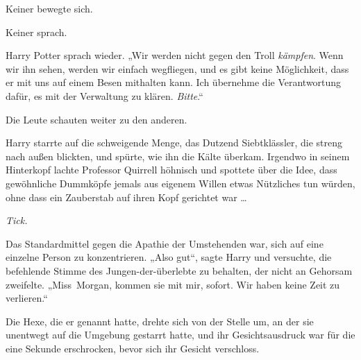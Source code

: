 Keiner bewegte sich.

Keiner sprach.

Harry Potter sprach wieder.
„Wir werden nicht gegen den Troll \emph{kämpfen}. Wenn wir ihn sehen, werden wir einfach wegfliegen, und es gibt keine Möglichkeit, dass er mit uns auf einem Besen mithalten kann. Ich übernehme die Verantwortung dafür, es mit der Verwaltung zu klären. \emph{Bitte}.“

Die Leute schauten weiter zu den anderen.

\later

Harry starrte auf die schweigende Menge, das Dutzend Siebtklässler, die streng nach außen blickten, und spürte, wie ihn die Kälte überkam. Irgendwo in seinem Hinterkopf lachte Professor Quirrell höhnisch und spottete über die Idee, dass gewöhnliche Dummköpfe jemals aus eigenem Willen etwas Nützliches tun würden, ohne dass ein Zauberstab auf ihren Kopf gerichtet war …

\emph{Tick.}

Das Standardmittel gegen die Apathie der Umstehenden war, sich auf eine einzelne Person zu konzentrieren.
„Also gut“, sagte Harry und versuchte, die befehlende Stimme des Jungen-der-überlebte zu behalten, der nicht an Gehorsam zweifelte.
„Miss~Morgan, kommen sie mit mir, sofort. Wir haben keine Zeit zu verlieren.“

Die Hexe, die er genannt hatte, drehte sich von der Stelle um, an der sie unentwegt auf die Umgebung gestarrt hatte, und ihr Gesichtsausdruck war für die eine Sekunde erschrocken, bevor sich ihr Gesicht verschloss.

